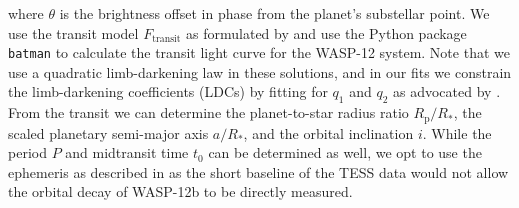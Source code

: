 \documentclass[fleqn,usenatbib]{mnras}
\begin{document}
\noindent where $\theta$ is the brightness offset in phase from the planet's substellar point. We use the transit model $F_\mathrm{transit}$ as formulated by \citet{mandel} and use the Python package \texttt{batman} \citep{batman} to calculate the transit light curve for the WASP-12 system. Note that we use a quadratic limb-darkening law in these solutions, and in our fits we constrain the limb-darkening coefficients (LDCs) by fitting for $q_{1}$ and $q_{2}$ as advocated by \citet{ldc}. From the transit we can determine the planet-to-star radius ratio $R_{\mathrm{p}}/R_{*}$, the scaled planetary semi-major axis $a/R_*$, and the orbital inclination $i$. While the period $P$ and midtransit time $t_{0}$ can be determined as well, we opt to use the ephemeris as described in \citet{orbitdecay} as the short baseline of the TESS data would not allow the orbital decay of WASP-12b to be directly measured.
\end{document}
